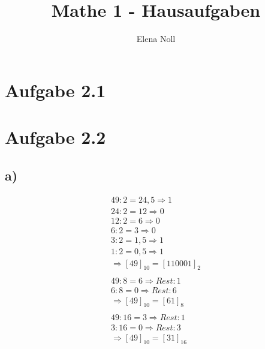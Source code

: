 \documentclass[12pt,a4paper]{article}
\author{Elena Noll}
\title{Mathe 1 - Hausaufgaben}
\begin{document}
\maketitle

\section*{Aufgabe 2.1}

\section*{Aufgabe 2.2}
\subsection*{a)}
\begin{align*}
49 : 2 = 24,5 \Rightarrow 1 \\
24 : 2 = 12 \Rightarrow 0 \\
12 : 2 = 6 \Rightarrow 0 \\
6 : 2 = 3 \Rightarrow 0 \\
3 : 2 = 1,5 \Rightarrow 1 \\
1 : 2 = 0,5 \Rightarrow 1 \\
\Rightarrow [49]_{10} = [110001]_{2} \\
\\
49 : 8 = 6 \Rightarrow Rest: 1 \\
6 : 8 = 0 \Rightarrow Rest: 6 \\
\Rightarrow [49]_{10} = [61]_{8} \\
\\
49 : 16 = 3 \Rightarrow Rest: 1 \\
3 : 16 = 0 \Rightarrow Rest: 3 \\
\Rightarrow [49]_{10} = [31]_{16}
\end{align*}
\end{document}
